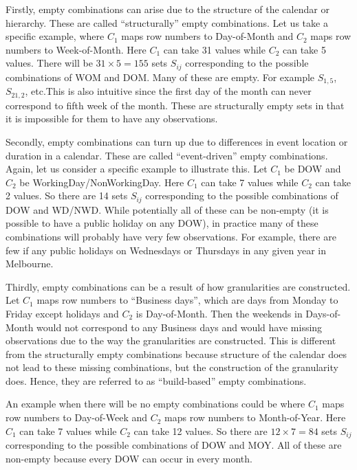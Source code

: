 \documentclass[12pt]{article}
\begin{document}
Firstly, empty combinations can arise due to the structure of the
calendar or hierarchy. These are called ``structurally'' empty
combinations. Let us take a specific example, where \(C_1\) maps row
numbers to Day-of-Month and \(C_2\) maps row numbers to Week-of-Month.
Here \(C_1\) can take 31 values while \(C_2\) can take 5 values. There
will be \(31\times 5=155\) sets \(S_{ij}\) corresponding to the possible
combinations of WOM and DOM. Many of these are empty. For example
\(S_{1,5}\), \(S_{21,2}\), etc.This is also intuitive since the first
day of the month can never correspond to fifth week of the month. These
are structurally empty sets in that it is impossible for them to have
any observations.

Secondly, empty combinations can turn up due to differences in event
location or duration in a calendar. These are called ``event-driven''
empty combinations. Again, let us consider a specific example to
illustrate this. Let \(C_1\) be DOW and \(C_2\) be
WorkingDay/NonWorkingDay. Here \(C_1\) can take 7 values while \(C_2\)
can take 2 values. So there are 14 sets \(S_{ij}\) corresponding to the
possible combinations of DOW and WD/NWD. While potentially all of these
can be non-empty (it is possible to have a public holiday on any DOW),
in practice many of these combinations will probably have very few
observations. For example, there are few if any public holidays on
Wednesdays or Thursdays in any given year in Melbourne.

Thirdly, empty combinations can be a result of how granularities are
constructed. Let \(C_1\) maps row numbers to ``Business days'', which
are days from Monday to Friday except holidays and \(C_2\) is
Day-of-Month. Then the weekends in Days-of-Month would not correspond to
any Business days and would have missing observations due to the way the
granularities are constructed. This is different from the structurally
empty combinations because structure of the calendar does not lead to
these missing combinations, but the construction of the granularity
does. Hence, they are referred to as ``build-based'' empty combinations.

An example when there will be no empty combinations could be where
\(C_1\) maps row numbers to Day-of-Week and \(C_2\) maps row numbers to
Month-of-Year. Here \(C_1\) can take 7 values while \(C_2\) can take 12
values. So there are \(12\times7=84\) sets \(S_{ij}\) corresponding to
the possible combinations of DOW and MOY. All of these are non-empty
because every DOW can occur in every month.
\end{document}

